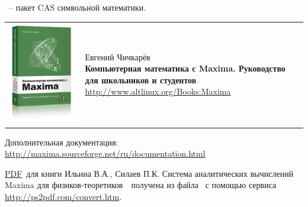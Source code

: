 \secdown

\ -- пакет CAS символьной математики.

\bigskip\noindent
\begin{tabular}{p{} p{}}
\includegraphics[height=0.45\textheight]{math/maxima/BookMaxima.png}
&
\parbox[b]{0.7\textwidth}{
Евгений Чичкарёв\\
\textbf{Компьютерная математика с Maxima. Руководство для школьников и
студентов}\\
\url{http://www.altlinux.org/Books:Maxima}\\
}
\\
\end{tabular}

\bigskip
Дополнительная документация:
\url{http://maxima.sourceforge.net/ru/documentation.html}

\bigskip\noindent
\href{https://drive.google.com/file/d/0B0u4WeMjO894M01wZmNkSW9GRHM/view?usp=sharing}{PDF}\
для книги Ильина В.А., Силаев П.К. Система аналитических вычислений Maxima для
физиков-теоретиков\ \cite{maxphis}\ получена из файла \file{.ps}\ с помощью
сервиса \url{http://ps2pdf.com/convert.htm}.










\secup
